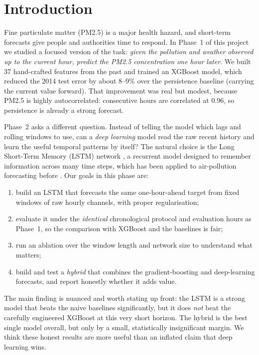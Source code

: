 \documentclass[onecolumn,11pt,journal]{IEEEtran}
\begin{document}
\section{Introduction}
Fine particulate matter (PM2.5) is a major health hazard, and short-term forecasts give people and authorities time to respond. In Phase~1 of this project we studied a focused version of the task: \emph{given the pollution and weather observed up to the current hour, predict the PM2.5 concentration one hour later}. We built 37 hand-crafted features from the past and trained an XGBoost model, which reduced the 2014 test error by about 8--9\% over the persistence baseline (carrying the current value forward). That improvement was real but modest, because PM2.5 is highly autocorrelated: consecutive hours are correlated at 0.96, so persistence is already a strong forecast.

Phase~2 asks a different question. Instead of telling the model which lags and rolling windows to use, can a \emph{deep learning} model read the raw recent history and learn the useful temporal patterns by itself? The natural choice is the Long Short-Term Memory (LSTM) network \cite{hochreiter1997}, a recurrent model designed to remember information across many time steps, which has been applied to air-pollution forecasting before \cite{li2017lstm}. Our goals in this phase are:
\begin{enumerate}
\item build an LSTM that forecasts the same one-hour-ahead target from fixed windows of raw hourly channels, with proper regularisation;
\item evaluate it under the \emph{identical} chronological protocol and evaluation hours as Phase~1, so the comparison with XGBoost and the baselines is fair;
\item run an ablation over the window length and network size to understand what matters;
\item build and test a \emph{hybrid} that combines the gradient-boosting and deep-learning forecasts, and report honestly whether it adds value.
\end{enumerate}

The main finding is nuanced and worth stating up front: the LSTM is a strong model that beats the naive baselines significantly, but it does \emph{not} beat the carefully engineered XGBoost at this very short horizon. The hybrid is the best single model overall, but only by a small, statistically insignificant margin. We think these honest results are more useful than an inflated claim that deep learning wins.
\end{document}
